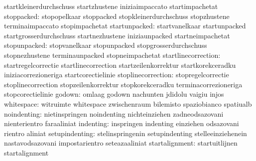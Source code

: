                                   startkleinerdurchschuss          startzhustene
                                  iniziaimpaccato                  startimpachetat
                      stoppacked: stopopelkaar                     stoppacked
                                  stopkleinerdurchschuss           stopzhustene
                                  terminaimpaccato                 stopimpachetat
                   startunpacked: startvanelkaar                   startunpacked
                                  startgrosserdurchschuss          startnezhustene
                                  iniziaunpacked                   startneimpachetat
                    stopunpacked: stopvanelkaar                    stopunpacked
                                  stopgrosserdurchschuss           stopnezhustene
                                  terminaunpacked                  stopneimpachetat
             startlinecorrection: startregelcorrectie              startlinecorrection
                                  startzeilenkorrektur             startkorekceradku
                                  iniziacorrezioneriga             startcorectielinie
              stoplinecorrection: stopregelcorrectie               stoplinecorrection
                                  stopzeilenkorrektur              stopkorekceradku
                                  terminacorrezioneriga            stopcorectielinie
                          godown: omlaag                           godown
                                  nachunten                        jdidolu
                                  vaigiu                           injos
                      whitespace: witruimte                        whitespace
                                  zwischenraum                     bilemisto
                                  spaziobianco                     spatiualb
                     noindenting: nietinspringen                   noindenting
                                  nichteinziehen                   zadneodsazovani
                                  nienterientro                    faraaliniat
                       indenting: inspringen                       indenting
                                  einziehen                        odsazovani
                                  rientro                          aliniat
                  setupindenting: stelinspringenin                 setupindenting
                                  stelleeinziehenein               nastavodsazovani
                                  impostarientro                   seteazaaliniat
                  startalignment: startuitlijnen                   startalignment

